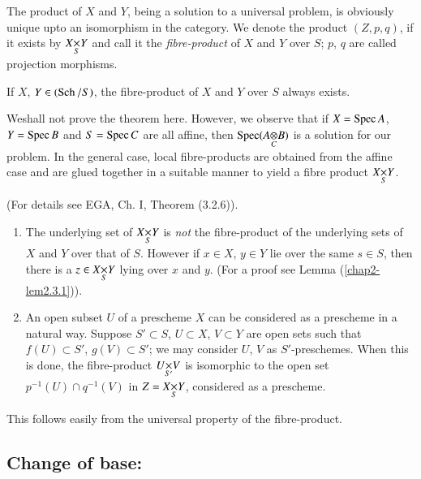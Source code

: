 The product of $X$ and $Y$, being a solution to a universal problem,
is obviously unique upto an isomorphism in the category. We denote the
product $(Z,p,q)$, if it exists by $\fprod{X}{Y}{S}$ and call it the
{\em fibre-product} of $X$ and $Y$ over $S$; $p$, $q$ are called
projection morphisms.

\begin{theorem}\label{chap2-thm2.2.1}
If $X$, $Y\in(\operatorname{Sch}/S)$, the fibre-product of $X$ and $Y$ over $S$
always exists.
\end{theorem}

We\pageoriginale shall not prove the theorem here. However, we observe
that if $X=\operatorname{Spec} A$, $Y=\operatorname{Spec} B$ and $S=\operatorname{Spec} C$ are all affine, then
$\Spec(\foprod{A}{B}{C})$ is a solution for our problem. In the
general case, local fibre-products are obtained from the affine case
and are glued together in a suitable manner to yield a fibre product
$\fprod{X}{Y}{S}$. 

(For details see EGA, Ch. I, Theorem (3.2.6)).

\begin{remarks*}
\begin{enumerate}
\renewcommand{\labelenumi}{(\theenumi)}
\item The underlying set of $\fprod{X}{Y}{S}$ is {\em not} the
  fibre-product of the underlying sets of $X$ and $Y$ over that of
  $S$. However if $x\in X$, $y\in Y$ lie over the same $s\in S$, then
  there is a $z\in\fprod{X}{Y}{S}$ lying over $x$ and $y$. (For a
  proof see Lemma (\ref{chap2-lem2.3.1})).

\item An open subset $U$ of a prescheme $X$ can be considered as a
  pres\-cheme in a natural way. Suppose $S'\subset S$, $U\subset X$,
  $V\subset Y$ are open sets such that $f(U)\subset S'$, $g(V)\subset
  S'$; we may consider $U$, $V$ as $S'$-preschemes. When this is done,
  the fibre-product $\fprod{U}{V}{S'}$ is isomorphic to the open set
  $p^{-1}(U)\cap q^{-1}(V)$ in $Z=\fprod{X}{Y}{S}$, considered as a
  prescheme.
\end{enumerate}
\end{remarks*}

This follows easily from the universal property of the fibre-product.

\setcounter{subsection}{1}
\subsection{Change of base:}\label{chap2-sec2.2.2}%

